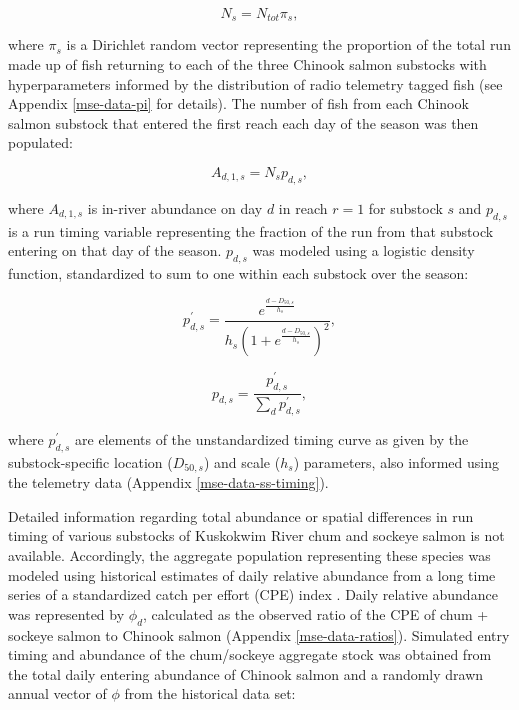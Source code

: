\documentclass[12pt,]{book}
\theoremstyle{definition}
\theoremstyle{definition}
\theoremstyle{definition}
\theoremstyle{remark}
\begin{document}
\begin{equation}
  N_s=N_{tot} \pi_s,
  \label{eq:get-ns}
\end{equation}

\noindent
where \(\pi_s\) is a Dirichlet random vector representing the proportion
of the total run made up of fish returning to each of the three Chinook
salmon substocks with hyperparameters informed by the distribution of
radio telemetry tagged fish (see Appendix \ref{mse-data-pi} for
details). The number of fish from each Chinook salmon substock that
entered the first reach each day of the season was then populated:

\begin{equation}
A_{d,1,s}=N_s p_{d,s},
  \label{eq:get-chin-entry}
\end{equation}

\noindent
where \(A_{d,1,s}\) is in-river abundance on day \(d\) in reach
\(r = 1\) for substock \(s\) and \(p_{d,s}\) is a run timing variable
representing the fraction of the run from that substock entering on that
day of the season. \(p_{d,s}\) was modeled using a logistic density
function, standardized to sum to one within each substock over the
season:

\begin{equation}
  p^{\prime}_{d,s} = \frac{e^{\frac{d-D_{50,s}}{h_s}}}{h_s \left(1 + e^{\frac{d-D_{50,s}}{h_s}} \right)^2},
  \label{eq:get-p-prime}
\end{equation}

\begin{equation}
  p_{d,s}=\frac{p^{\prime}_{d,s}}{\sum_d p^{\prime}_{d,s}},
  \label{eq:get-p}
\end{equation}

\noindent
where \(p^{\prime}_{d,s}\) are elements of the unstandardized timing
curve as given by the substock-specific location (\(D_{50,s}\)) and
scale (\(h_s\)) parameters, also informed using the telemetry data
(Appendix \ref{mse-data-ss-timing}).

Detailed information regarding total abundance or spatial differences in
run timing of various substocks of Kuskokwim River chum and sockeye
salmon is not available. Accordingly, the aggregate population
representing these species was modeled using historical estimates of
daily relative abundance from a long time series of a standardized catch
per effort (CPE) index \citep[the Bethel Test Fishery --
BTF;][]{bue-lipka-2016}. Daily relative abundance was represented by
\(\phi_d\), calculated as the observed ratio of the CPE of chum +
sockeye salmon to Chinook salmon (Appendix \ref{mse-data-ratios}).
Simulated entry timing and abundance of the chum/sockeye aggregate stock
was obtained from the total daily entering abundance of Chinook salmon
and a randomly drawn annual vector of \(\phi\) from the historical data
set:
\end{document}
